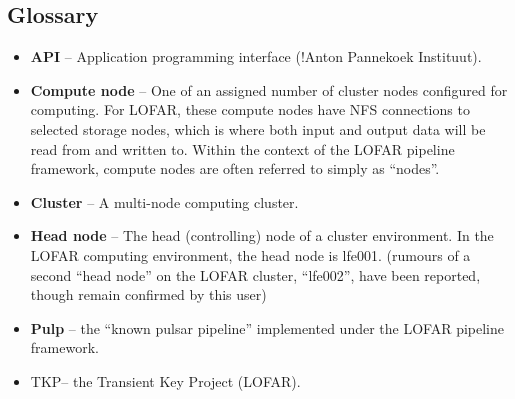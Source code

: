 \documentclass[a4paper,10pt,bibtotoc]{scrartcl}
\begin{document}
\subsection{Glossary}
\begin{itemize}
\item \textbf{API} -- Application programming interface (!Anton Pannekoek Instituut).
\item \textbf{Compute node} -- One of an assigned number of cluster nodes 
configured for computing.  For LOFAR, these compute nodes have NFS connections 
to selected storage nodes, which is where both input and output data will be 
read from  and written to.  Within the context of the LOFAR pipeline framework, compute nodes
are often referred to simply as ``nodes''.
\item \textbf{Cluster} -- A multi-node computing cluster.
\item \textbf{Head node} -- The head (controlling) node of a cluster environment. In the LOFAR 
computing environment, the head node is lfe001.  (rumours of a second
``head node'' on the LOFAR cluster, ``lfe002'', have been reported,
though remain confirmed by this user)
\item \textbf{Pulp} -- the ``known pulsar pipeline'' implemented under
  the LOFAR pipeline framework.
\item \textsc{TKP}-- the Transient Key Project (LOFAR).
\end{itemize}
\end{document}
